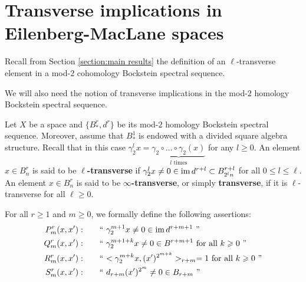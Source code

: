 \section{Transverse implications in Eilenberg-MacLane spaces}\label{section:qwertz}

Recall from Section \ref{section:main results} the definition of an $\ell$-transverse element in a mod-$2$ cohomology Bockstein spectral sequence.

\begin{defn_transverse_coH}

\end{defn_transverse_coH}

We will also need the notion of transverse implications in the mod-$2$ homology Bockstein spectral sequence.

\begin{defn}
Let $X$ be a space and $\{B_*^r,d^r\}$ be its mod-$2$ homology Bockstein spectral sequence. Moreover, assume that $B_*^1$ is endowed with a divided square algebra structure. Recall that in this case $\gamma_2^lx=\underbrace{\gamma_2\circ\dots\circ\gamma_2(x)}_{\text{$l$ times}}$ for any $l\geq0$. An element $x\in B_n^r$ is said to be {\bf $\ell$-transverse} if $\gamma_2^lx\not=0\in\operatorname{im} d^{r+l}\subset B_{2^l n}^{r+l}$ for all $0\leq l\leq\ell$. An element $x\in B_n^r$ is said to be {\bf $\infty$-transverse}, or simply {\bf transverse}, if it is $\ell$-transverse for all $\ell\geq0$.
\end{defn}

\begin{defn}
For all $r\geq1$ and $m\geq0$, we formally define the following assertions:
\begin{align*}
P^r_m(x,x'):\qquad&\text{`` $\gamma_2^{m+1}x\not=0\in\operatorname{im} d^{r+m+1}$ ''}\\
Q^r_m(x,x'):\qquad&\text{`` $\gamma_2^{m+1+k}x\not=0\in B^{r+m+1}$ for all $k\geqslant0$ ''}\\
R^r_m(x,x'):\qquad&\text{`` $<\gamma_2^{m+k}x,(x')^{2^{m+k}}>_{r+m}=1$ for all $k\geqslant0$ ''}\\
S^r_m(x,x'):\qquad&\text{`` $d_{r+m}(x')^{2^m}\not=0\in B_{r+m}$ ''}
\end{align*}
\end{defn}

